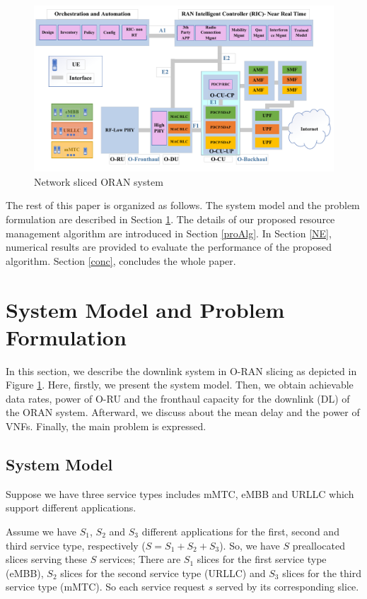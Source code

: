 \documentclass[conference]{IEEEtran}
\begin{document}
\begin{figure}
  \centering 
    \includegraphics[scale = 0.75]{finalDraw.pdf}
  \caption{Network sliced ORAN system}
  \label{fig:c11}
\end{figure}

The rest of this paper is organized as follows. The system model and the problem formulation are described in Section \ref{systemmodel}. The details of our proposed resource management algorithm are introduced in Section \ref{proAlg}. In Section \ref{NE}, numerical results are provided to evaluate the performance of the proposed algorithm. Section \ref{conc}, concludes the whole paper.

\section{System Model and Problem Formulation}\label{systemmodel}

In this section, we describe the downlink system in O-RAN slicing as depicted in Figure \ref{fig:c11}. 
Here, firstly, we present the system model. Then, we obtain achievable data rates, power of O-RU and the fronthaul capacity for the downlink (DL) of the ORAN system. Afterward, we discuss about the mean delay and the power of VNFs.
Finally, the main problem is expressed.
\subsection{System Model}
Suppose we have three service types includes mMTC, eMBB and URLLC which support different applications.

Assume we have $S_1$, $S_2$ and $S_3$ different applications for the first, second and third service type, respectively ($S = S_1 + S_2 + S_3$).
So, we have $S$ preallocated slices serving these $S$ services; There are $S_1$ slices for the first service type (eMBB), $S_2$ slices for the second service type (URLLC) and $S_3$ slices for the third service type (mMTC). So each service request $s$ served by its corresponding slice.
\end{document}
